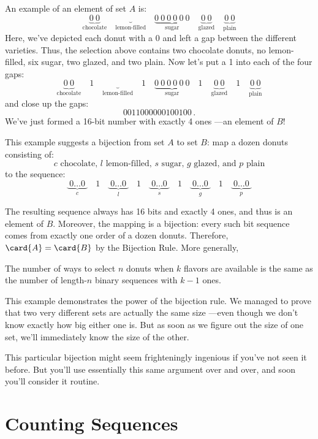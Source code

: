 An example of an element of set $A$ is:
%
\[
\underbrace{0\ 0}_{\text{chocolate}} \quad
\underbrace{}_{\text{lemon-filled}} \quad
\underbrace{0\ 0\ 0\ 0\ 0\ 0}_{\text{sugar}} \quad
\underbrace{0\ 0}_{\text{glazed}} \quad
\underbrace{0\ 0}_{\text{plain}}
\]
Here, we've depicted each donut with a $0$ and left a gap between
the different varieties.  Thus, the selection above contains two
chocolate donuts, no lemon-filled, six sugar, two glazed, and two
plain.  Now let's put a 1 into each of the four gaps:
\[
\underbrace{0\ 0}_{\text{chocolate}} \quad 1 \quad
\underbrace{}_{\text{lemon-filled}} \quad 1 \quad
\underbrace{0\ 0\ 0\ 0\ 0\ 0}_{\text{sugar}} \quad 1 \quad
\underbrace{0\ 0}_{\text{glazed}} \quad 1 \quad
\underbrace{0\ 0}_{\text{plain}}
\]
and close up the gaps:
\[
0011000000100100 \,.
\]
We've just formed a 16-bit number with exactly 4 ones ---an element of
$B$!

This example suggests a bijection from set $A$ to set $B$: map a dozen
donuts consisting of:
%
\[
\text{$c$ chocolate, $l$ lemon-filled, $s$ sugar, $g$ glazed, and $p$ plain}
\]
%
to the sequence:
%
\[
\underbrace{\ 0 \ldots 0\ }_{\text{$c$}} \quad 1 \quad
\underbrace{\ 0 \ldots 0\ }_{\text{$l$}} \quad 1 \quad
\underbrace{\ 0 \ldots 0\ }_{\text{$s$}} \quad 1 \quad
\underbrace{\ 0 \ldots 0\ }_{\text{$g$}} \quad 1 \quad
\underbrace{\ 0 \ldots 0\ }_{\text{$p$}}
\]

The resulting sequence always has 16 bits and exactly 4 ones, and thus
is an element of $B$.  Moreover, the mapping is a bijection: every
such bit sequence comes from exactly one order of a dozen donuts.
Therefore, $\card{A} = \card{B}$ by the Bijection Rule.  More generally,
\begin{lemma}\label{lem:donut_bij}
The number of ways to select $n$ donuts when $k$ flavors are available is
the same as the number of length-$n$ binary sequences with $k-1$ ones.
\end{lemma}

This example demonstrates the power of the bijection rule.
We managed to prove that two very different sets are actually the same
size ---even though we don't know exactly how big either one is.  But
as soon as we figure out the size of one set, we'll immediately know
the size of the other.

This particular bijection might seem frighteningly ingenious if you've
not seen it before.  But you'll use essentially this same argument
over and over, and soon you'll consider it routine.

\section{Counting Sequences}\label{sec:counting_sequences}

